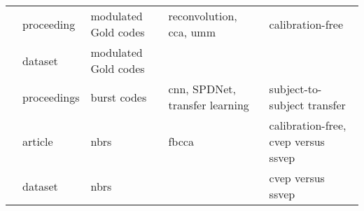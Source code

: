 \documentclass[a4paper,landscape]{article}
\begin{document}
\begin{table}[H]
\begin{tabular}{p{5cm}p{2cm}p{5cm}p{5cm}p{6.5cm}}
		\citeauthor{thielen2024} & proceeding & modulated Gold codes & reconvolution, \acrshort{cca}, \acrshort{umm} & calibration-free \\
		\citeauthor{thielen2024dataset} & dataset & modulated Gold codes & & \\
		\citeauthor{velut2024} & proceedings & burst codes & \acrshort{cnn}, SPDNet, transfer learning & subject-to-subject transfer \\
		\citeauthor{zheng2024a} & article & \acrshort{nbrs} & \acrshort{fbcca} & calibration-free, \acrshort{cvep} versus \acrshort{ssvep} \\
		\citeauthor{zheng2024b} & dataset & \acrshort{nbrs} & & \acrshort{cvep} versus \acrshort{ssvep} \\
		\bottomrule
	\end{tabular}
\end{table}
\end{document}
